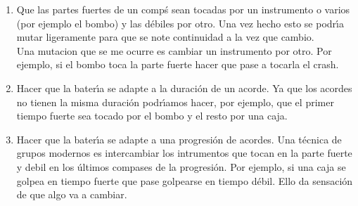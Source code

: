 \documentclass[a4paper]{report}
\begin{document}
\begin{enumerate}
\item Que las partes fuertes de un comp\'s sean tocadas por un instrumento o varios
(por ejemplo el bombo) y las d\'ebiles por otro. Una vez hecho esto se podr\'\i a
mutar ligeramente para que se note continuidad a la vez que cambio.\\ 
Una mutacion que se me ocurre es cambiar un instrumento por otro. Por ejemplo, 
si el bombo toca la parte fuerte hacer que pase a tocarla el crash.
\item Hacer que la bater\'\i a se adapte a la duraci\'on de un acorde. Ya que los
acordes no tienen la misma duraci\'on podr\'\i amos hacer, por ejemplo, que el primer
tiempo fuerte sea tocado por el bombo y el resto por una caja.
\item Hacer que la bater\'\i a se adapte a una progresi\'on de acordes. Una t\'ecnica 
de grupos modernos es intercambiar los intrumentos que tocan en la parte
fuerte y debil en los \'ultimos compases de la progresi\'on. Por ejemplo, 
si una caja se golpea en tiempo fuerte que 
pase golpearse en tiempo d\'ebil. Ello da sensaci\'on de que algo va a cambiar.
\end{enumerate}
\end{document}
